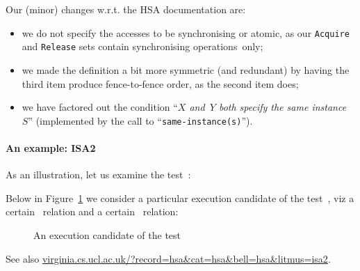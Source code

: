\documentclass[a4paper]{article}
\begin{document}
Our (minor) changes w.r.t. the HSA documentation are:
\begin{itemize}
\item we do not specify the accesses to be synchronising or atomic, as our
\texttt{Acquire} and \texttt{Release} sets contain synchronising
operations~only;
\item we made the definition a bit more symmetric (and redundant) by having the
third item produce fence-to-fence order, as the second item does;

\item we have factored out the condition ``\emph{$X$ and~$Y$ both specify the
same instance~$S$}'' (implemented by the call to ``\verb+same-instance(s)+'').
\end{itemize}

\pagebreak

\paragraph{An example: ISA2}

As an illustration, let us examine the test~:
{\footnotesize

}

Below in Figure~\ref{isa2coh} we consider a particular execution candidate of
the test~, viz a certain~\rf{} relation and a certain~\coh{}
relation:
\begin{figure}[!h]
\begin{center}
\end{center}
\caption{\label{isa2coh}An execution candidate of the test~ \color{green}{(Allowed)}}
\end{figure}

See also
\url{virginia.cs.ucl.ac.uk/?record=hsa&cat=hsa&bell=hsa&litmus=isa2}.
\end{document}
